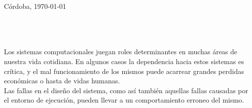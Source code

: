 \documentclass[titlepage, 12pt]{book}
\begin{document}
\begin{titlepage}
\begin{center}

\vfill

\begin{flushright}
{C\'ordoba, \today}
\end{flushright}

\end{center}
\end{titlepage}


\newpage
~\\

\newpage
\chapter*{}

Los sistemas computacionales juegan roles determinantes en muchas \'areas de nuestra vida cotidiana. En algunos casos la dependencia hacia estos sistemas es cr\'itica, y el mal funcionamiento de los mismos puede acarrear grandes perdidas econ\'omicas o hasta de vidas humanas.\\

Las fallas en el dise\~no del sistema, como as\'i tambi\'en aquellas fallas causadas por el entorno de ejecuci\'on, pueden llevar a un comportamiento erroneo del mismo.\\
%
\end{document}
